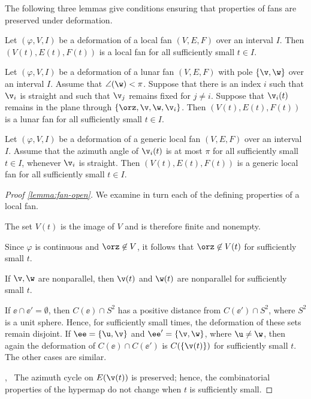 The following 
three lemmas give conditions ensuring that  properties of fans are
preserved under deformation.


\begin{lemma}\label{lemma:fan-open}
  Let $(\varphi,V,I)$ be a deformation of a  local fan
  $(V,E,F)$ over an interval $I$. 
Then $(V(t),E(t),F(t))$ is a
local fan for all sufficiently small $t\in I$.
\end{lemma}

\begin{lemma}\label{lemma:fan-open-lunar}
  Let $(\varphi,V,I)$ be a deformation of a lunar fan $(V,E,F)$ with pole $\{\v,\w\}$
  over
  an interval $I$.  Assume that $\angle(\w)<\pi$.
  Suppose that there is an index $i$ such that
  $\v_i$ is straight and such that $\v_j$ remains fixed for $j\ne i$.
  Suppose that $\v_i(t)$ remains in the plane through
  $\{\orz,\v,\w,\v_i\}$.  Then $(V(t),E(t),F(t))$
 is a lunar fan for
  all sufficiently small $t\in I$.
\end{lemma}

\begin{lemma}\label{lemma:fan-open-generic}
Let $(\varphi,V,I)$ be a deformation of a generic local fan
  $(V,E,F)$ over an interval $I$.  
Assume that the azimuth angle of $\v_i(t)$ is at most
$\pi$ for all sufficiently small $t\in I$, whenever $\v_i$ is straight.  Then 
 $(V(t),E(t),F(t))$ is a
generic local fan for all sufficiently small $t\in I$.
\end{lemma}

\begin{proof}[Proof \eqref{lemma:fan-open}] 
We examine in turn each of the defining properties of a local fan.

 The set $V(t)$ is the image of $V$ and is
therefore finite and nonempty.

 Since $\varphi$ is continuous and
$\orz\not\in V$, it follows that $\orz\not\in V(t)$ for sufficiently
small $t$.

 If $\v,\w$ are nonparallel, then $\v(t)$ and
$\w(t)$ are nonparallel for sufficiently small $t$.

 If $\ee \cap \ee'=\emptyset$, then $C(\ee)\cap
S^2$ has a positive distance from $C(\ee')\cap S^2$, where $S^2$ is a unit sphere.  
Hence, for
sufficiently small times, the deformation of these sets remain
disjoint.  If $\ee=\{\u,\v\}$ and $\ee'=\{\v,\w\}$, where $\u\ne\w$,
then again the deformation of $C(\ee)\cap C(\ee')$ is
$C(\{\v(t)\})$ for sufficiently small $t$.  The other cases are
similar.
%

,~ The azimuth cycle on $E(\v(t))$
is preserved; hence, the combinatorial properties of the hypermap do
not change when $t$ is sufficiently small.
\end{proof}

